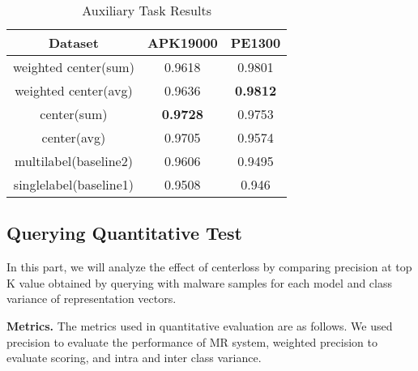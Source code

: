 \begin{table}[!htb]%
\caption{Auxiliary Task Results}
\label{tab:auxiliary_result}
\begin{minipage}{\columnwidth}
\begin{center}
\begin{tabular}{|c|c|c|}
\hline
Dataset             & APK19000 & PE1300 \\ \hline
weighted center(sum)  & 0.9618   & 0.9801 \\ \hline
weighted center(avg) & 0.9636   & \textbf{0.9812} \\ \hline
center(sum)         & \textbf{0.9728 }  & 0.9753 \\ \hline
center(avg)        & 0.9705   & 0.9574 \\ \hline
multilabel(baseline2)          & 0.9606   & 0.9495 \\ \hline
singlelabel(baseline1)              & 0.9508   & 0.946  \\ \hline
\end{tabular}
\end{center}
\bigskip\centering
\end{minipage}
\end{table}%


\subsection{Querying Quantitative Test}

In this part, we will analyze the effect of centerloss by comparing precision at top K value obtained by querying with malware samples for each model and class variance of representation vectors.

\textbf{Metrics. } The metrics used in quantitative evaluation are as follows. We used precision to evaluate the performance of MR system, weighted precision to evaluate scoring, and intra and inter class variance.


